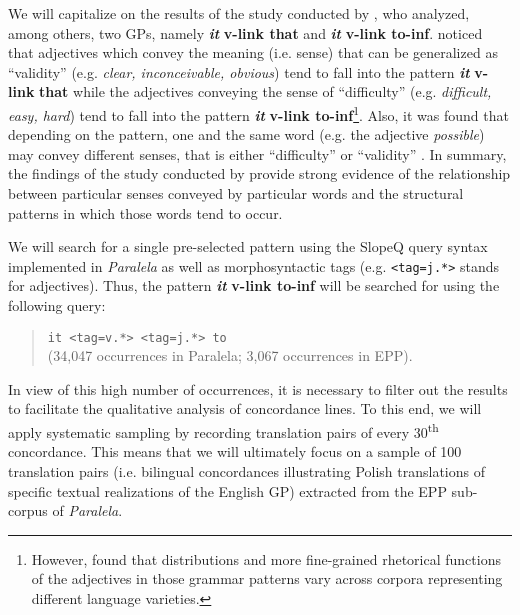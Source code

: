\documentclass[output=paper]{langscibook}
\begin{document}
We will capitalize on the results of the study conducted by \citet{Groom2005}, who analyzed, among others, two GPs, namely \textbf{\textit{it} }\textbf{v-link \textbf{{\ADJ}} \textbf{that}} and \textbf{\textit{it} }\textbf{v-link \textbf{{\ADJ}} \textbf{to-}}\textbf{inf}. \citet[259--260]{Groom2005} noticed that adjectives which convey the meaning (i.e. sense) that can be generalized as “validity” (e.g. \textit{clear, inconceivable, obvious}) tend to fall into the pattern \textbf{\textit{it} }\textbf{v-link} \textbf{\textit{{\ADJ}} \textbf{that}} while the adjectives conveying the sense of “difficulty” (e.g. \textit{difficult, easy, hard}) tend to fall into the pattern \textbf{\textit{it} }\textbf{v-link \textbf{{\ADJ}} \textbf{to-}}\textbf{inf}\footnote{However, \citet{Groom2005} found that distributions and more fine-grained rhetorical functions of the adjectives in those grammar patterns vary across corpora representing different language varieties.}. Also, it was found that depending on the pattern, one and the same word (e.g. the adjective \textit{possible}) may convey different senses, that is either “difficulty” or “validity” \citep[259]{Groom2005}. In summary, the findings of the study conducted by \citet{Groom2005} provide strong evidence of the relationship between particular senses conveyed by particular words and the structural patterns in which those words tend to occur.

We will search for a single pre-selected pattern using the SlopeQ query syntax implemented in \textit{Paralela} as well as morphosyntactic tags (e.g. \texttt{<tag=j.*>} stands for adjectives). Thus, the pattern \textbf{\textit{it} }\textbf{v-link \textbf{{\ADJ}} \textbf{to-}}\textbf{inf} will be searched for using the following query:

\begin{quote}
\texttt{it <tag=v.*> <tag=j.*> to}\\
(34,047 occurrences in Paralela; 3,067 occurrences in EPP).
\end{quote}

In view of this high number of occurrences, it is necessary to filter out the results to facilitate the qualitative analysis of concordance lines. To this end, we will apply systematic sampling by recording translation pairs of every 30\textsuperscript{th} concordance. This means that we will ultimately focus on a sample of 100 translation pairs (i.e. bilingual concordances illustrating Polish translations of specific textual realizations of the English GP) extracted from the EPP sub-corpus of \textit{Paralela}.
\end{document}
